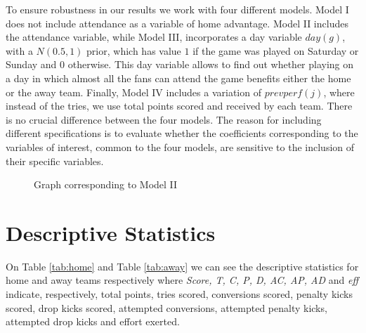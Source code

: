 \documentclass[]{article}
\begin{document}
To ensure robustness in our results we work with four different models. Model I does not include attendance as a variable of home advantage. Model II includes the attendance variable, while Model III, incorporates a day variable $day(g)$, with a $N(0.5,1)$ prior, which has value $1$ if the game was played on Saturday or Sunday and $0$ otherwise. This day variable allows to find out whether playing on a day in which almost all the fans can attend the game benefits either the home or the away team. Finally, Model IV includes a variation of $prevperf(j)$, where instead of the tries, we use total points scored and received by each team. There is no crucial difference between the four models. The reason for including different specifications is to evaluate whether the coefficients corresponding to the variables of interest, common to the four models, are sensitive to the inclusion of their specific variables.
\begin{figure}[h!]
	
\caption{Graph corresponding to Model II}
\label{fig:graf}
\end{figure} 




\section{Descriptive Statistics}
On Table \ref{tab:home} and Table \ref{tab:away} we can see the descriptive statistics for home and away teams respectively where \textit{Score, T, C, P, D, AC, AP, AD} and {\it eff} indicate, respectively, total points, tries scored, conversions scored, penalty kicks scored, drop kicks scored, attempted conversions, attempted penalty kicks, attempted drop kicks and effort exerted.
\end{document}
